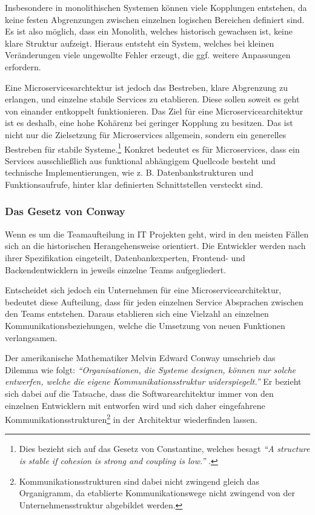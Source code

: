 Insbesondere in monolithischen Systemen können viele Kopplungen entstehen, da keine festen Abgrenzungen zwischen einzelnen logischen Bereichen definiert sind. Es ist also möglich, dass ein Monolith, welches historisch gewachsen ist, keine klare Struktur aufzeigt. Hieraus entsteht ein System, welches bei kleinen Veränderungen viele ungewollte Fehler erzeugt, die ggf. weitere Anpassungen erfordern.

Eine Microservicesarchtektur ist jedoch das Bestreben, klare Abgrenzung zu erlangen, und einzelne stabile Services zu etablieren. Diese sollen soweit es geht von einander entkoppelt funktionieren. Das Ziel für eine Microservicearchitektur ist es deshalb, eine hohe Kohärenz bei geringer Kopplung zu besitzen. Das ist nicht nur die Zielsetzung für Microservices allgemein, sondern ein generelles Bestreben für stabile Systeme.\footnote{Dies bezieht sich auf das Gesetz von Constantine, welches besagt \textit{\enquote{A structure is stable if cohesion is strong and coupling is low.}} \parencite[S. 43]{endres_handbook_2003}.} Konkret bedeutet es für Microservices, dass ein Services ausschließlich aus funktional abhängigem Quellcode besteht und technische Implementierungen, wie z. B. Datenbankstrukturen und Funktionsaufrufe, hinter klar definierten Schnittstellen versteckt sind.

\subsubsection{Das Gesetz von Conway}
\label{sec:conway}

Wenn es um die Teamaufteilung in IT Projekten geht, wird in den meisten Fällen sich an die historischen Herangehensweise orientiert. Die Entwickler werden nach ihrer Spezifikation eingeteilt, Datenbankexperten, Frontend- und Backendentwicklern in jeweils einzelne Teams aufgegliedert.

Entscheidet sich jedoch ein Unternehmen für eine Microservicearchitektur, bedeutet diese Aufteilung, dass für jeden einzelnen Service Absprachen zwischen den Teams entstehen. Daraus etablieren sich eine Vielzahl an einzelnen Kommunikationsbeziehungen, welche die Umsetzung von neuen Funktionen verlangsamen.

Der amerikanische Mathematiker Melvin Edward Conway umschrieb das Dilemma wie folgt:
\textit{\enquote{Organisationen, die Systeme designen, können nur solche entwerfen, welche die eigene Kommunikationsstruktur widerspiegelt.}}
Er bezieht sich dabei auf die Tatsache, dass die Softwarearchitektur immer von den einzelnen Entwicklern mit entworfen wird und sich daher eingefahrene Kommunikationsstrukturen\footnote{Kommunikationsstrukturen sind dabei nicht zwingend gleich das Organigramm, da etablierte Kommunikationswege nicht zwingend von der Unternehmensstruktur abgebildet werden.} in der Architektur wiederfinden lassen.

